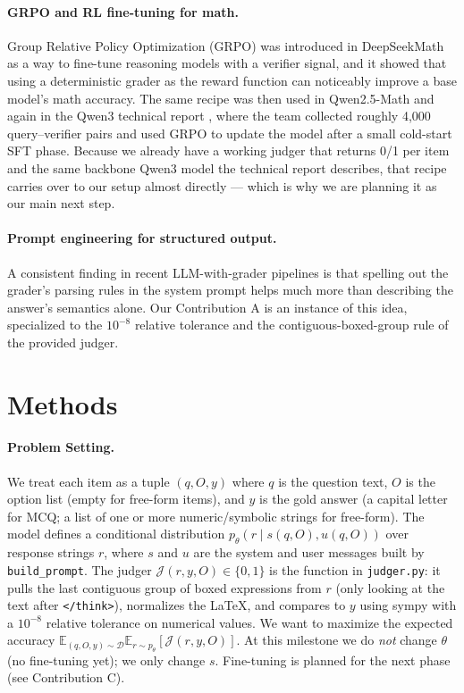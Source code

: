\documentclass{article}
\begin{document}
\paragraph{GRPO and RL fine-tuning for math.}
Group Relative Policy Optimization (GRPO) was introduced in
DeepSeekMath \citep{shao2024deepseekmath} as a way to fine-tune
reasoning models with a verifier signal, and it showed that using a
deterministic grader as the reward function can noticeably improve
a base model's math accuracy. The same recipe was then used in
Qwen2.5-Math \citep{qwen25math} and again in the Qwen3 technical
report \citep{qwen3technicalreport}, where the team collected
roughly 4{,}000 query--verifier pairs and used GRPO to update the
model after a small cold-start SFT phase. Because we already have a
working judger that returns 0/1 per item and the same backbone
Qwen3 model the technical report describes, that recipe carries
over to our setup almost directly --- which is why we are planning
it as our main next step.

\paragraph{Prompt engineering for structured output.}
A consistent finding in recent LLM-with-grader pipelines is that
spelling out the grader's parsing rules in the system prompt helps
much more than describing the answer's semantics alone. Our
Contribution A is an instance of this idea, specialized to the
$10^{-8}$ relative tolerance and the contiguous-boxed-group rule
of the provided judger.


\section{Methods}
\label{sec:methods}

\paragraph{Problem Setting.}
We treat each item as a tuple $(q, O, y)$ where $q$ is the
question text, $O$ is the option list (empty for free-form items),
and $y$ is the gold answer (a capital letter for MCQ; a list of one
or more numeric/symbolic strings for free-form). The model defines a
conditional distribution $p_\theta(r \mid s(q, O), u(q, O))$ over
response strings $r$, where $s$ and $u$ are the system and user
messages built by \texttt{build\_prompt}. The judger
$\mathcal{J}(r, y, O) \in \{0, 1\}$ is the function in
\texttt{judger.py}: it pulls the last contiguous group of
boxed expressions from $r$ (only looking at the text after
\texttt{</think>}), normalizes the LaTeX, and compares to $y$
using sympy with a $10^{-8}$ relative tolerance on numerical
values. We want to maximize the expected accuracy
$\mathbb{E}_{(q, O, y) \sim \mathcal{D}}\mathbb{E}_{r \sim p_\theta}[\mathcal{J}(r, y, O)]$.
At this milestone we do \emph{not} change $\theta$ (no fine-tuning
yet); we only change $s$. Fine-tuning is planned for the next phase
(see Contribution C).
\end{document}
